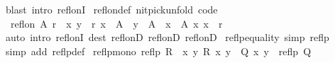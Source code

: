 \begin{isabellebody}
%
\isadelimproof
%
\endisadelimproof
%
\isatagproof
{}\isamarkupfalse%
\ {\isacharparenleft}{\kern0pt}blast\ intro{\isacharcolon}{\kern0pt}\ refl{\isacharunderscore}{\kern0pt}onI{\isacharparenright}{\kern0pt}%
\endisatagproof
{\isafoldproof}%
%
\isadelimproof
\isanewline
%
\endisadelimproof
\isanewline
{}\isamarkupfalse%
\ refl{\isacharunderscore}{\kern0pt}on{\isacharunderscore}{\kern0pt}def{\isacharprime}{\kern0pt}\ {\isacharbrackleft}{\kern0pt}nitpick{\isacharunderscore}{\kern0pt}unfold{\isacharcomma}{\kern0pt}\ code{\isacharbrackright}{\kern0pt}{\isacharcolon}{\kern0pt}\isanewline
\ \ {\isachardoublequoteopen}refl{\isacharunderscore}{\kern0pt}on\ A\ r\ {\isasymlongleftrightarrow}\ {\isacharparenleft}{\kern0pt}{\isasymforall}{\isacharparenleft}{\kern0pt}x{\isacharcomma}{\kern0pt}\ y{\isacharparenright}{\kern0pt}\ {\isasymin}\ r{\isachardot}{\kern0pt}\ x\ {\isasymin}\ A\ {\isasymand}\ y\ {\isasymin}\ A{\isacharparenright}{\kern0pt}\ {\isasymand}\ {\isacharparenleft}{\kern0pt}{\isasymforall}x\ {\isasymin}\ A{\isachardot}{\kern0pt}\ {\isacharparenleft}{\kern0pt}x{\isacharcomma}{\kern0pt}\ x{\isacharparenright}{\kern0pt}\ {\isasymin}\ r{\isacharparenright}{\kern0pt}{\isachardoublequoteclose}\isanewline
%
\isadelimproof
\ \ %
\endisadelimproof
%
\isatagproof
{}\isamarkupfalse%
\ {\isacharparenleft}{\kern0pt}auto\ intro{\isacharcolon}{\kern0pt}\ refl{\isacharunderscore}{\kern0pt}onI\ dest{\isacharcolon}{\kern0pt}\ refl{\isacharunderscore}{\kern0pt}onD\ refl{\isacharunderscore}{\kern0pt}onD{}\ refl{\isacharunderscore}{\kern0pt}onD{}{\isacharparenright}{\kern0pt}%
\endisatagproof
{\isafoldproof}%
%
\isadelimproof
\isanewline
%
\endisadelimproof
\isanewline
{}\isamarkupfalse%
\ reflp{\isacharunderscore}{\kern0pt}equality\ {\isacharbrackleft}{\kern0pt}simp{\isacharbrackright}{\kern0pt}{\isacharcolon}{\kern0pt}\ {\isachardoublequoteopen}reflp\ {\isacharparenleft}{\kern0pt}{\isacharequal}{\kern0pt}{\isacharparenright}{\kern0pt}{\isachardoublequoteclose}\isanewline
%
\isadelimproof
\ \ %
\endisadelimproof
%
\isatagproof
{}\isamarkupfalse%
\ {\isacharparenleft}{\kern0pt}simp\ add{\isacharcolon}{\kern0pt}\ reflp{\isacharunderscore}{\kern0pt}def{\isacharparenright}{\kern0pt}%
\endisatagproof
{\isafoldproof}%
%
\isadelimproof
\isanewline
%
\endisadelimproof
\isanewline
{}\isamarkupfalse%
\ reflp{\isacharunderscore}{\kern0pt}mono{\isacharcolon}{\kern0pt}\ {\isachardoublequoteopen}reflp\ R\ {\isasymLongrightarrow}\ {\isacharparenleft}{\kern0pt}{\isasymAnd}x\ y{\isachardot}{\kern0pt}\ R\ x\ y\ {\isasymlongrightarrow}\ Q\ x\ y{\isacharparenright}{\kern0pt}\ {\isasymLongrightarrow}\ reflp\ Q{\isachardoublequoteclose}\isanewline

\end{isabellebody}
